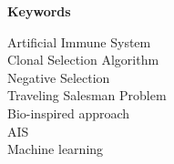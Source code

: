 %
%
% 
% 
% 

\begin{center}
{\Large\bfseries Keywords}
\end{center}

\noindent
Artificial Immune System\\
Clonal Selection Algorithm\\
Negative Selection\\
Traveling Salesman Problem\\
Bio-inspired approach\\
AIS\\
Machine learning



